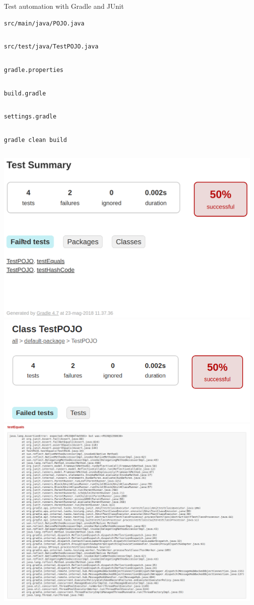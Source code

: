\documentclass[presentation]{beamer}
\newcommand{\codefile}[4]{
	\begin{block}{\texttt{#2}}
		\inputminted[fontsize=#3,linenos=true,breaklines=true]{#4}{"workspace/#1/#2"}
	\end{block}
}
\newcommand{\java}[3]{\codefile{#1}{#2}{#3}{java}}
\newcommand{\groovy}[3]{\codefile{#1}{#2}{#3}{groovy}}
\newcommand{\terminal}[3]{\codefile{#1}{#2}{#3}{text}}
\newcommand{\tinier}{\fontsize{4pt}{5pt}\selectfont}
\begin{document}
\begin{frame}{Test automation with Gradle and JUnit}
    \java{15-Test}{src/main/java/POJO.java}{\tinier}
    \java{15-Test}{src/test/java/TestPOJO.java}{\tinier}
    \groovy{15-Test}{gradle.properties}{\scriptsize}
    \groovy{15-Test}{build.gradle}{\scriptsize}
    \groovy{15-Test}{settings.gradle}{\normalsize}
    \terminal{15-Test}{gradle clean build}{\tiny}
    \centering
    \includegraphics[width=.9\textwidth,height=.8\textheight,keepaspectratio]{img/gradleTestReport0}
    \includegraphics[width=.9\textwidth,height=.8\textheight,keepaspectratio]{img/gradleTestReport1}
    \includegraphics[width=.9\textwidth,height=.8\textheight,keepaspectratio]{img/gradleTestReport2}

\end{frame}
\end{document}
